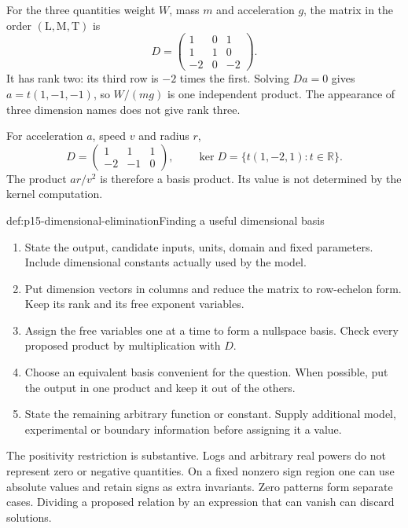For the three quantities weight \(W\), mass \(m\) and acceleration \(g\),
the matrix in the order \((\mathrm L,\mathrm M,\mathrm T)\) is
\[
 D=\begin{pmatrix}1&0&1\\1&1&0\\-2&0&-2\end{pmatrix}.
\]
It has rank two: its third row is \(-2\) times the first. Solving \(Da=0\)
gives \(a=t(1,-1,-1)\), so \(W/(mg)\) is one independent product.
The appearance of three dimension names does not give rank three.

For acceleration \(a\), speed \(v\) and radius \(r\),
\[
 D=\begin{pmatrix}1&1&1\\-2&-1&0\end{pmatrix},
 \qquad \ker D=\{t(1,-2,1):t\in\mathbb R\}.
\]
The product \(ar/v^2\) is therefore a basis product. Its value is not
determined by the kernel computation.

\begin{hbmethod}{def:p15-dimensional-elimination}{Finding a useful dimensional basis}
\begin{enumerate}
\item State the output, candidate inputs, units, domain and fixed parameters.
Include dimensional constants actually used by the model.
\item Put dimension vectors in columns and reduce the matrix to row-echelon
form. Keep its rank and its free exponent variables.
\item Assign the free variables one at a time to form a nullspace basis.
Check every proposed product by multiplication with \(D\).
\item Choose an equivalent basis convenient for the question. When possible,
put the output in one product and keep it out of the others.
\item State the remaining arbitrary function or constant. Supply additional
model, experimental or boundary information before assigning it a value.
\end{enumerate}
\end{hbmethod}

The positivity restriction is substantive. Logs and arbitrary real powers
do not represent zero or negative quantities. On a fixed nonzero sign region
one can use absolute values and retain signs as extra invariants. Zero
patterns form separate cases. Dividing a proposed relation by an expression
that can vanish can discard solutions.

